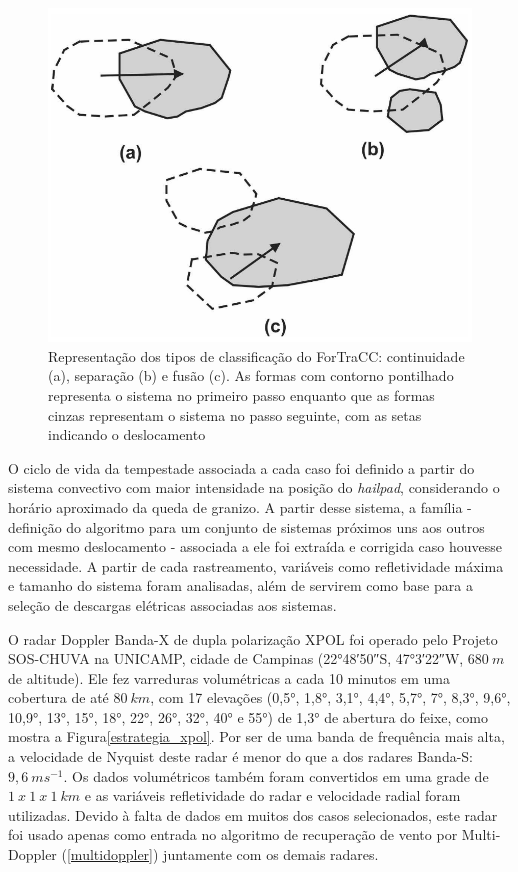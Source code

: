 \begin{figure}[htb]
	\begin{center}
		\caption{Representação dos tipos de classificação do ForTraCC: continuidade (a), separação (b) e fusão (c). As formas com contorno pontilhado representa o sistema no primeiro passo enquanto que as formas cinzas representam o sistema no passo seguinte, com as setas indicando o deslocamento} 
		\label{fortracc_teoria}
		\includegraphics[width=0.5\columnwidth]{figs/fortracc_classes.png}
	\end{center}
\end{figure}

O ciclo de vida da tempestade associada a cada caso foi definido a partir do sistema convectivo com maior intensidade na posição do \textit{hailpad}, considerando o horário aproximado da queda de granizo. A partir desse sistema, a família - definição do algoritmo para um conjunto de sistemas próximos uns aos outros com mesmo deslocamento - associada a ele foi extraída e corrigida caso houvesse necessidade. A partir de cada rastreamento, variáveis como refletividade máxima e tamanho do sistema foram analisadas, além de servirem como base para a seleção de descargas elétricas associadas aos sistemas.

O radar Doppler Banda-X de dupla polarização XPOL foi operado pelo Projeto SOS-CHUVA na UNICAMP, cidade de Campinas (\ang{22;48;50}\:S, \ang{47;3;22}\:W, $680\:m$ de altitude). Ele fez varreduras volumétricas a cada 10 minutos em uma cobertura de até $80\:km$, com 17 elevações (\ang{0,5}, \ang{1,8}, \ang{3,1}, \ang{4,4}, \ang{5,7}, \ang{7}, \ang{8,3}, \ang{9,6}, \ang{10,9}, \ang{13}, \ang{15}, \ang{18}, \ang{22}, \ang{26}, \ang{32}, \ang{40} e \ang{55}) de \ang{1,3} de abertura do feixe, como mostra a Figura\autoref{estrategia_xpol}. Por ser de uma banda de frequência mais alta, a velocidade de Nyquist deste radar é menor do que a dos radares Banda-S: $9,6\:ms^{-1}$. Os dados volumétricos também foram convertidos em uma grade de $1\:x\:1\:x\:1\:km$ e as variáveis refletividade do radar e velocidade radial foram utilizadas. Devido à falta de dados em muitos dos casos selecionados, este radar foi usado apenas como entrada no algoritmo de recuperação de vento por Multi-Doppler (\autoref{multidoppler}) juntamente com os demais radares.

